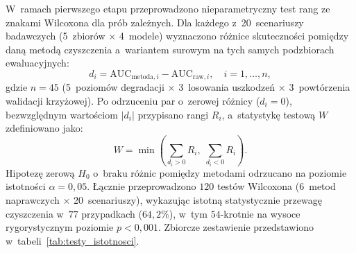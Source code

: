 W~ramach pierwszego etapu przeprowadzono nieparametryczny test rang ze znakami Wilcoxona dla prób zależnych. Dla każdego z~20~scenariuszy badawczych (5~zbiorów $\times$ 4~modele) wyznaczono różnice skuteczności pomiędzy daną metodą czyszczenia a~wariantem surowym na tych samych podzbiorach ewaluacyjnych:
\begin{equation}
d_i = \mathrm{AUC}_{\text{metoda}, i} - \mathrm{AUC}_{\text{raw}, i}, \quad i = 1, \dots, n,
\label{eq:wilcoxon_diff}
\end{equation}
gdzie $n = 45$ (5~poziomów degradacji $\times$ 3~losowania uszkodzeń $\times$ 3~powtórzenia walidacji krzyżowej). Po odrzuceniu par o~zerowej różnicy ($d_i = 0$), bezwzględnym wartościom $|d_i|$ przypisano rangi $R_i$, a~statystykę testową $W$ zdefiniowano jako:
\begin{equation}
W = \min\left( \sum_{d_i > 0} R_i, \; \sum_{d_i < 0} R_i \right).
\label{eq:wilcoxon_stat}
\end{equation}
Hipotezę zerową $H_0$ o~braku różnic pomiędzy metodami odrzucano na poziomie istotności $\alpha = 0{,}05$. Łącznie przeprowadzono $120$ testów Wilcoxona (6~metod naprawczych $\times$ 20~scenariuszy), wykazując istotną statystycznie przewagę czyszczenia w~$77$ przypadkach ($64{,}2\%$), w~tym $54$-krotnie na wysoce rygorystycznym poziomie $p < 0{,}001$. Zbiorcze zestawienie przedstawiono w~tabeli~\ref{tab:testy_istotnosci}.

\begin{table}[H]
\centering
\caption{Liczba konfiguracji (na 5~zbiorów danych), w~których dana metoda czyszczenia wykazała istotną statystycznie przewagę nad wariantem \texttt{raw} (test Wilcoxona, $\alpha = 0{,}05$)}
\label{tab:testy_istotnosci}
\vspace{0.2cm}
\end{table}

